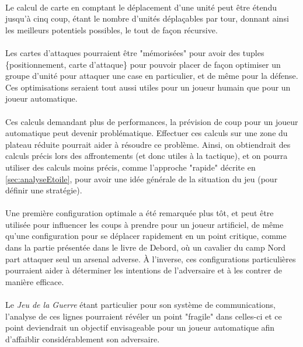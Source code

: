 \documentclass[a4paper]{report}
\begin{document}
\paragraph*{} 
Le calcul de carte en comptant le déplacement d'une unité peut être étendu jusqu'à cinq coup, étant le nombre d'unités déplaçables par tour, donnant ainsi les meilleurs potentiels possibles, le tout de façon récursive. 

\paragraph*{} 
Les cartes d'attaques pourraient être "mémorisées" pour avoir des tuples \{positionnement, carte d'attaque\} pour pouvoir placer de façon optimiser un groupe d'unité pour attaquer une case en particulier, et de même pour la défense. Ces optimisations seraient tout aussi utiles pour un joueur humain que pour un joueur automatique.

\paragraph*{} 
Ces calculs demandant plus de performances, la prévision de coup pour un joueur automatique peut devenir problématique. Effectuer ces calculs sur une zone du plateau réduite pourrait aider à résoudre ce problème. Ainsi, on obtiendrait des calculs précis lors des affrontements (et donc utiles à la tactique), et on pourra utiliser des calculs moins précis, comme l'approche "rapide" décrite en \ref{sec:analyseEtoile}, pour avoir une idée générale de la situation du jeu (pour définir une stratégie).

\paragraph*{}
Une première configuration optimale a été remarquée plus tôt, et peut être utilisée pour influencer les coups à prendre pour un joueur artificiel, de même qu'une configuration pour se déplacer rapidement en un point critique, comme dans la partie présentée dans le livre de Debord, où un cavalier du camp Nord part attaquer seul un arsenal adverse. \`A l'inverse, ces configurations particulières pourraient aider à déterminer les intentions de l'adversaire et à les contrer de manière efficace.

\paragraph*{}
Le {\it Jeu de la Guerre} étant particulier pour son système de communications, l'analyse de ces lignes pourraient révéler un point "fragile" dans celles-ci et ce point deviendrait un objectif envisageable pour un joueur automatique afin d'affaiblir considérablement son adversaire. 
\end{document}
